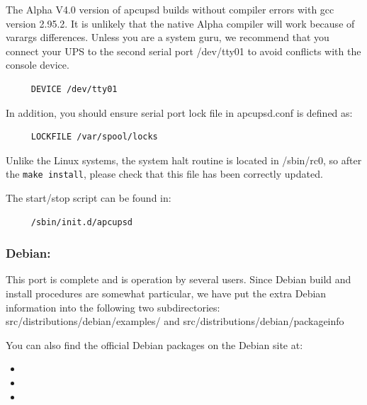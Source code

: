 \label{index-Alpha-32}
\label{index-OS_002c-Alpha-33}
The Alpha V4.0 version of apcupsd builds without compiler errors with gcc
version 2.95.2. It is unlikely that the native Alpha compiler will work
because of varargs differences. Unless you are a system guru, we recommend
that you connect your UPS to the second serial port /dev/tty01 to avoid
conflicts with the console device. 

\footnotesize
\begin{verbatim}
     DEVICE /dev/tty01
\end{verbatim}
\normalsize

In addition, you should ensure serial port lock file in apcupsd.conf is
defined as: 

\footnotesize
\begin{verbatim}
     LOCKFILE /var/spool/locks
\end{verbatim}
\normalsize

Unlike the Linux systems, the system halt routine is located in /sbin/rc0, so
after the {\tt make install}, please check that this file has been correctly
updated.  

The start/stop script can be found in: 

\footnotesize
\begin{verbatim}
     /sbin/init.d/apcupsd
\end{verbatim}
\normalsize

\label{Debian}

\subsubsection*{Debian:}

\label{index-Debian-34}
\label{index-OS_002c-Debian-35}
This port is complete and is operation by several users. Since Debian build
and install procedures are somewhat particular, we have put the extra Debian
information into the following two subdirectories:
\lt{}src\gt{}/distributions/debian/examples/ and
\lt{}src\gt{}/distributions/debian/packageinfo  

You can also find the official Debian packages on the Debian site at:  

\begin{itemize}
\item 
\item 
\item 
\end{itemize}

